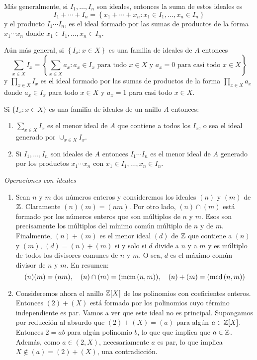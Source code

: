 Más generalmente, si $I_1,\dots,I_n$ son ideales, entonces la suma de estos ideales es
$$I_1+\cdots +I_n=\left\lbrace x_1+\cdots+x_n: x_1\in I_1,\dots, x_n\in I_n\right\rbrace$$
y el producto $I_1\cdots I_n$, es el ideal formado por las sumas de productos de la forma $x_1\cdots x_n$ donde $x_1\in I_1,\dots,x_n\in I_n$.

Aún más general, si $\left\lbrace I_x : x\in X\right\rbrace$ es una familia de ideales de $A$ entonces
$$\sum_{x\in X}I_x=\left\lbrace \sum_{x\in X}a_x : a_x \in I_x\text{ para todo }x\in X\text{ y }a_x=0\text{ para casi todo }x\in X\right\rbrace$$
y $\prod_{x\in X}I_x$ es el ideal formado por las sumas de productos de la forma $\prod_{x\in X}a_x$ donde $a_x\in I_x$ para todo $x\in X$ y $a_x=1$ para casi todo $x\in X$.

\begin{prop}
    Si $\{I_x: x\in X\}$ es una familia de ideales de un anillo $A$ entonces:
    \begin{enumerate}[label=(\arabic*)]
        \item $\sum_{x\in X}I_x$ es el menor ideal de $A$ que contiene a todos los $I_x$, o sea el ideal generado por $\cup_{x\in X}I_x$.
        \item Si $I_1,\dots,I_n$ son ideales de $A$ entonces $I_1\cdots I_n$ es el menor ideal de $A$ generado por los productos $x_1\cdots x_n$ con $x_1\in I_1,\dots, x_n\in I_n$.
    \end{enumerate}
\end{prop}

\begin{ej}{\it Operaciones con ideales}
    \begin{enumerate}[label=(\arabic*)]
        \item Sean $n$ y $m$ dos números enteros y consideremos los ideales $(n)$ y $(m)$ de $\mathbb{Z}$. Claramente $(n)(m)=(nm)$. Por otro lado, $(n)\cap(m)$ está formado por los números enteros que son múltiplos de $n$ y $m$. Esos son precisamente los múltiplos del mínimo común múltiplo de $n$ y de $m$. Finalmente, $(n)+(m)$ es el menor ideal $(d)$ de $\mathbb{Z}$ que contiene a $(n)$ y $(m)$, $(d)=(n)+(m)$ si y solo si $d$ divide a $n$ y a $m$ y es múltiplo de todos los divisores comunes de $n$ y $m$. O sea, $d$ es el máximo común divisor de $n$ y $m$. En resumen:
        $$(n)(m)=(nm), \quad (n)\cap(m)=(\operatorname{\rm mcm}\left(n,m\right)), \quad (n)+(m)=(\operatorname{\rm mcd}\left(n,m\right))$$

        \item Consideremos ahora el anillo $\mathbb{Z}[X]$ de los polinomios con coeficientes enteros. Entonces $(2) + (X)$ está formado por los polinomios cuyo término independiente es par. Vamos a ver que este ideal no es principal. Supongamos por reducción al absurdo que $(2)+(X)=(a)$ para algún $a\in\mathbb{Z}[X]$. Entonces $2=ab$ para algún polinomio $b$, lo que que implica que $a\in\mathbb{Z}$. Además, como $a\in (2, X)$, necesariamente $a$ es par, lo que implica $X \notin (a)=(2)+(X)$, una contradicción.
    \end{enumerate}
\end{ej}

